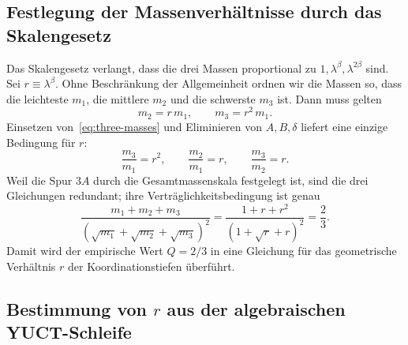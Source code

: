 \documentclass[11pt,a4paper]{article}
\theoremstyle{remark}
\begin{document}
	\subsection{Festlegung der Massenverhältnisse durch das Skalengesetz}
	
	Das Skalengesetz verlangt, dass die drei Massen proportional zu \(1, \lambda^{\beta}, \lambda^{2\beta}\) sind. Sei \(r \equiv \lambda^{\beta}\). Ohne Beschränkung der Allgemeinheit ordnen wir die Massen so, dass die leichteste \(m_1\), die mittlere \(m_2\) und die schwerste \(m_3\) ist. Dann muss gelten
	\begin{equation}
		m_2 = r\, m_1, \qquad m_3 = r^2\, m_1 .
	\end{equation}
	Einsetzen von~\eqref{eq:three-masses} und Eliminieren von \(A,B,\delta\) liefert eine einzige Bedingung für \(r\):
	\begin{equation}
		\frac{m_3}{m_1} = r^2, \qquad
		\frac{m_2}{m_1} = r, \qquad
		\frac{m_3}{m_2} = r .
	\end{equation}
	Weil die Spur \(3A\) durch die Gesamtmassenskala festgelegt ist, sind die drei Gleichungen redundant; ihre Verträglichkeitsbedingung ist genau
	\begin{equation}
		\frac{m_1 + m_2 + m_3}{(\sqrt{m_1}+\sqrt{m_2}+\sqrt{m_3})^2}
		= \frac{1 + r + r^2}{(1 + \sqrt{r} + r)^2} = \frac{2}{3}.
		\label{eq:Qr}
	\end{equation}
	Damit wird der empirische Wert \(Q=2/3\) in eine Gleichung für das geometrische Verhältnis \(r\) der Koordinationstiefen überführt.
	
	\subsection{Bestimmung von \(r\) aus der algebraischen YUCT-Schleife}
	
\end{document}
